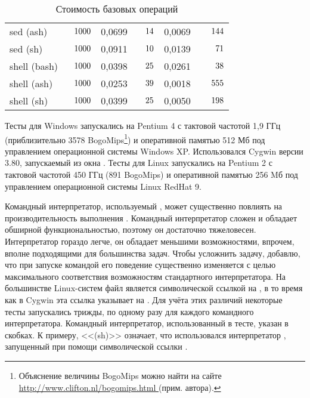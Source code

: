 \begin{table}[!b]
{\begin{tabular}{llllll}
sed (ash) & $\hphantom{0.}1000$ & 0,0699 & $\hphantom{00}14$& 0,0069 & $\hphantom{00.}144$ \\
\vspace{0.5em}
sed (sh) & $\hphantom{0.}1000$ & 0,0911 & $\hphantom{00}10$ & 0,0139 & $\hphantom{000.}71$ \\
\vspace{0.5em}
shell (bash) & $\hphantom{0.}1000$ & 0,0398 & $\hphantom{00}25$ & 0,0261 & $\hphantom{000.}38$ \\
\vspace{0.5em}
shell (ash) & $\hphantom{0.}1000$ & 0,0253 & $\hphantom{00}39$ & 0,0018 & $\hphantom{00.}555$ \\
\vspace{0.3em}
shell (sh) & $\hphantom{0.}1000$ & 0,0399 & $\hphantom{00}25$ & 0,0050 & $\hphantom{00.}198$ \\
\hline
\end{tabular}
}
\caption{Стоимость базовых операций} \label{tab:cost_of_operations}
\end{table}

Тесты для Windows запускались на Pentium 4 с тактовой частотой 1,9 ГГц
(приблизительно 3578 BogoMips\footnote{
Объяснение величины BogoMips можно найти на сайте
\url{http://www.clifton.nl/bogomips.html } (прим. автора).})
и оперативной памятью 512 Мб под управлением операционной системы
Windows XP. Использовался Cygwin \GNUmake{} версии 3.80, запускаемый
из окна . Тесты для Linux запускались на Pentium 2 с
тактовой частотой 450 ГГц (891 BogoMips) и оперативной памятью 256 Mб
под управлением операционной системы Linux RedHat 9.

Командный интерпретатор, используемый \GNUmake{}, может существенно
повлиять на производительность выполнения . Командный
интерпретатор  сложен и обладает обширной
функциональностью, поэтому он достаточно тяжеловесен. Интерпретатор
 гораздо легче, он обладает меньшими возможностями,
впрочем, вполне подходящими для большинства задач. Чтобы усложнить
задачу, добавлю, что при запуске  командой
 его поведение существенно изменяется с целью
максимального соответствия возможностям стандартного интерпретатора.
На большинстве Linux\hyp{}систем файл  является
символической ссылкой на , в то время как в Cygwin эта
ссылка указывает на . Для учёта этих различий некоторые
тесты запускались трижды, по одному разу для каждого командного
интерпретатора. Командный интерпретатор, использованный в тесте,
указан в скобках. К примеру, <<(sh)>> означает, что использовался
интерпретатор , запущенный при помощи символической
ссылки .

